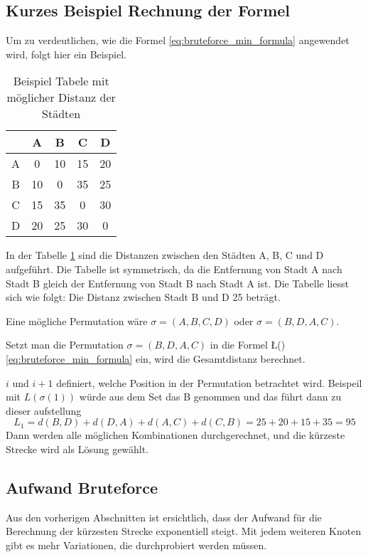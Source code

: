 \subsection{Kurzes Beispiel Rechnung der Formel
\label{variationsprinzip_algorithmen:section:bruteforce_calculate}}
Um zu verdeutlichen, wie die Formel \ref{eq:bruteforce_min_formula} 
angewendet wird, folgt hier ein Beispiel.

\begin{table}[h]
    \centering
    \begin{tabular}{|c|c|c|c|c|}
    \hline
       & A  & B  & C  & D  \\ \hline
    A  & 0  & 10 & 15 & 20 \\ \hline
    B  & 10 & 0  & 35 & 25 \\ \hline
    C  & 15 & 35 & 0  & 30 \\ \hline
    D  & 20 & 25 & 30 & 0  \\ \hline
    \end{tabular}
    \caption{Beispiel Tabele mit möglicher Distanz der Städten}
    \label{tab:example_bruteforce_cities}
\end{table}
    
In der Tabelle \ref{tab:example_bruteforce_cities} sind die Distanzen 
zwischen den Städten A, B, C und D aufgeführt. Die Tabelle ist symmetrisch, 
da die Entfernung von Stadt A nach Stadt B gleich der Entfernung von 
Stadt B nach Stadt A ist.
Die Tabelle liesst sich wie folgt: Die Distanz zwischen Stadt B und D 25 beträgt.

Eine mögliche Permutation wäre \(\sigma = (A, B, C, D)\) oder \(\sigma = (B, D, A, C)\).

Setzt man die Permutation \(\sigma = (B, D, A, C)\) in die Formel \L(\sigma) 
\ref{eq:bruteforce_min_formula} ein, wird die Gesamtdistanz berechnet.


\(i\) und \(i+1\) definiert, welche Position in der Permutation betrachtet wird. 
Beispeil mit \( L(\sigma(1)) \) würde aus dem Set das B genommen und das führt 
dann zu dieser aufstellung
\begin{equation}
    \label{eq:bruteforce_min_formula}
        L_1 = d(B, D) + d(D, A) + d(A, C) + d(C, B)
            = 25 + 20 + 15 + 35 = 95
\end{equation}
Dann werden alle möglichen Kombinationen durchgerechnet, und die kürzeste 
Strecke wird als Lösung gewählt.

\subsection{Aufwand Bruteforce
\label{variationsprinzip_algorithmen:section:bruteforce}}
Aus den vorherigen Abschnitten ist ersichtlich, dass der Aufwand für die 
Berechnung der kürzesten Strecke exponentiell steigt. Mit jedem weiteren 
Knoten gibt es mehr Variationen, die durchprobiert werden müssen.

